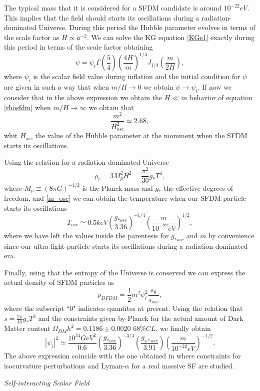 \documentclass[amssymb,twocolumn,prd,nofootinbib,showpacs]{revtex4-1}
\begin{document}
The typical mass that it is considered for a SFDM candidate is around $10^{-22} eV$. This implies that the field should starts its oscillations during a radiation-dominated Universe. During this period the Hubble parameter evolves in terms of the scale factor as $H\propto a^{-2}$. We can solve the KG equation \eqref{KGe1} exactly during this period in terms of the scale factor obtaining
\begin{equation}
\psi = \psi_i\Gamma\left(\frac{5}{4}\right)\left(\frac{4H}{m}\right)^{1/4}J_{1/4}\left(\frac{m}{2H}\right),
\end{equation}
where $\psi_i$ is the scalar field value during inflation and the initial condition for $\psi$ are given in such a way that when $m/H\rightarrow 0$ we obtain $\psi\rightarrow\psi_i$. If now we consider that in the above expression we obtain the $H\ll m$ behavior of equation \eqref{rhosfdm} when $m/H\rightarrow \infty$ we obtain that
\begin{equation}\label{m_osc}
\frac{m^2}{H_{osc}^2}\simeq 2.68,
\end{equation}
whit $H_{osc}$ the value of the Hubble parameter at the momment when the SFDM starts its oscillations.

Using the relation for a radiation-dominated Universe
\begin{equation}
\rho_r = 3M_p^2H^2=\frac{\pi^2}{30}g_*T^4,
\end{equation}
where $M_p\equiv (8\pi G)^{-1/2}$ is the Planck mass and $g_*$ the effective degrees of freedom, and \eqref{m_osc} we can obtain the temperature when our SFDM particle starts its oscillations
\begin{equation}
T_{osc}\simeq 0.5 keV\left(\frac{g_{*osc}}{3.36}\right)^{-1/4}\left(\frac{m}{10^{-22}eV}\right)^{1/2},
\end{equation}
where we have left the values inside the parentesis for $g_{*osc}$ and $m$ by convenience since our ultra-light particle starts its oscillations during a radiation-dominated era. 

Finally, using that the entropy of the Universe is conserved we can express the actual density of SFDM particles as
\begin{equation}
\rho_{DFDM}=\frac{1}{2}m^2\psi_i^2\frac{s_0}{s_{osc}},
\end{equation}
where the subscript ``$0$" indicates quantites at present. Using the relation that $s=\frac{2\pi}{45}g_{*}T^3$ and the constraints given by Planck \cite{Planckcolaboration} for the actual amount of Dark Matter content $\Omega_{DM}h^2=0.1186\pm 0.0020$ $68\% CL$, we finally obtain 
\begin{equation}\label{phi_im2}
|\psi_i|^2\simeq\frac{10^{34}GeV^2}{0.6}\left(\frac{g_{*osc}}{3.36}\right)^{-3/4}\left(\frac{g_{s*osc}}{3.91}\right)\left(\frac{m}{10^{-22}eV}\right)^{-1/2}.
\end{equation}
The above expression coincide with the one obtained in \cite{SFrev2} where constraints for isocurvature perturbations and Lyman-$\alpha$ for a real massive SF are studied.
\begin{center}
\textit{Self-interacting Scalar Field}
\end{center}
\end{document}
